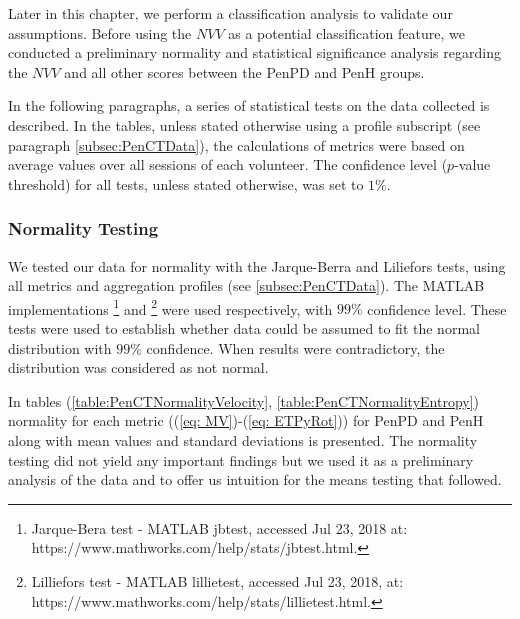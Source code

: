 Later in this chapter, we perform a classification analysis to validate our assumptions. Before using the $NVV$ as a potential classification feature, we conducted a preliminary normality and statistical significance analysis regarding the $NVV$ and all other scores between the \gls{PenPD} and \gls{PenH} groups. 

In the following paragraphs, a series of statistical tests on the data collected is described. In the tables, unless stated otherwise using a profile subscript (see paragraph \ref{subsec:PenCTData}), the calculations of metrics were based on average values over all sessions of each volunteer. The confidence level ($p$-value threshold) for all tests, unless stated otherwise, was set to $1\%$.

\subsubsection{Normality Testing}
\label{subsubsec:PenCTNormalityTesting}
We tested our data for normality with the Jarque-Berra and Liliefors tests, using all metrics and aggregation profiles (see \ref{subsec:PenCTData}). The MATLAB implementations \footnote{Jarque-Bera test - MATLAB jbtest, accessed Jul 23, 2018 at: https://www.mathworks.com/help/stats/jbtest.html.} and \footnote{Lilliefors test - MATLAB lillietest, accessed Jul 23, 2018, at: https://www.mathworks.com/help/stats/lillietest.html.} were used respectively, with $99\%$ confidence level. These tests were used to establish whether data could be assumed to fit the normal distribution with $99\%$ confidence. When results were contradictory, the distribution was considered as not normal. 

In tables (\ref{table:PenCTNormalityVelocity}, \ref{table:PenCTNormalityEntropy}) normality for each metric ((\ref{eq: MV})-(\ref{eq: ETPyRot})) for \gls{PenPD} and \gls{PenH} along with mean values and standard deviations is presented.
The normality testing did not yield any important findings but we used it as a preliminary analysis of the data and to offer us intuition for the means testing that followed. 

